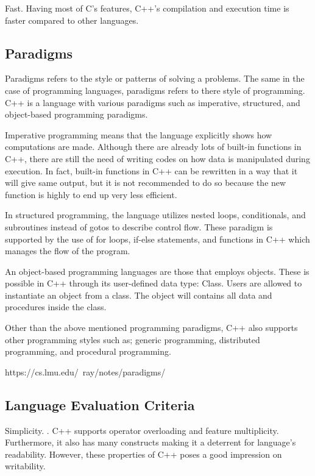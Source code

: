 \documentclass[a4paper, 12pt]{article}
\begin{document}
Fast. Having most of C's features, C++'s compilation and execution time is faster compared to other languages.


\subsection{Paradigms}

Paradigms refers to the style or patterns of solving a problems. The same in the case of programming languages, paradigms refers to there style of programming. C++ is a language with various paradigms such as imperative, structured, and object-based programming paradigms. 

Imperative programming means that the language explicitly shows how computations are made. Although there are already lots of built-in functions in C++, there are still the need of writing codes on how data is manipulated during execution. In fact, built-in functions in C++ can be rewritten in a way that it will give same output, but it is not recommended to do so because the new function is highly to end up very less efficient. 

In structured programming, the language utilizes nested loops, conditionals, and subroutines instead of gotos to describe control flow. These paradigm is supported by the use of for loops, if-else statements, and functions in C++ which manages the flow of the program.

An object-based programming languages are those that employs objects. These is possible in C++ through its user-defined data type: Class. Users are allowed to instantiate an object from a class. The object will contains all data and procedures inside the class. 

Other than the above mentioned programming paradigms, C++ also supports other programming styles such as; generic programming, distributed programming, and procedural programming. 

https://cs.lmu.edu/~ray/notes/paradigms/


\subsection{Language Evaluation Criteria}

Simplicity. . C++ supports operator overloading and feature multiplicity. Furthermore, it also has many constructs making it a deterrent for language's readability. However, these properties of C++ poses a good impression on writability.  
\end{document}
